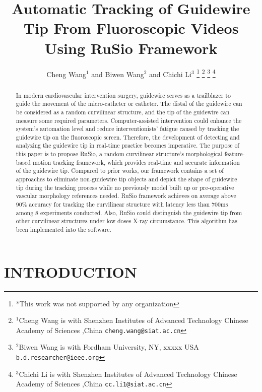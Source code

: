 \documentclass[letterpaper, 10 pt, conference]{ieeeconf}  %
\title{\LARGE \bf
Automatic Tracking of Guidewire Tip From Fluoroscopic Videos Using RuSio Framework
}
\author{Cheng Wang$^{1}$ and Biwen Wang$^{2}$ and Chichi Li$^{3}$%
\thanks{*This work was not supported by any organization}%
\thanks{$^{1}$Cheng Wang is with Shenzhen Institutes of Advanced Technology Chinese Academy of Sciences ,China
        {\tt\small cheng.wang@siat.ac.cn}}%
\thanks{$^{2}$Biwen Wang is with Fordham University, NY, xxxxx USA
        {\tt\small b.d.researcher@ieee.org}}%
\thanks{$^{3}$Chichi Li is with Shenzhen Institutes of Advanced Technology Chinese Academy of Sciences ,China
        {\tt\small cc.li1@siat.ac.cn}}%
}
\begin{document}
\maketitle
\thispagestyle{empty}
\pagestyle{empty}


\begin{abstract}

In modern cardiovascular intervention surgery, guidewire serves as a trailblazer to guide the movement of the micro-catheter or catheter. The distal of the guidewire can be considered as a random curvilinear structure, and the tip of the guidewire can measure some required parameters. Computer-assisted intervention could enhance the system's automation level and reduce interventionists' fatigue caused by tracking the guidewire tip on the fluoroscopic screen. Therefore, the development of detecting and analyzing the guidewire tip in real-time practice becomes imperative. The purpose of this paper is to propose RuSio, a random curvilinear structure's morphological feature-based motion tracking framework, which provides real-time and accurate information of the guidewire tip. Compared to prior works, our framework contains a set of approaches to eliminate non-guidewire tip objects and depict the shape of guidewire tip during the tracking process while no previously model built up or pre-operative vascular morphology references needed. RuSio framework achieves on average above 90\% accuracy for tracking the curvilinear structure with latency less than 700ms among 8 experiments conducted. Also, RuSio could distinguish the guidewire tip from other curvilinear structures under low doses X-ray circumstance. This algorithm has been implemented into the software.

\end{abstract}


\section{INTRODUCTION}
\end{document}
